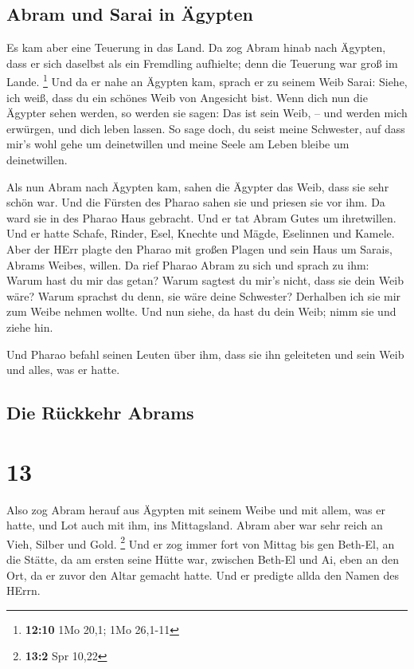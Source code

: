 \hypertarget{abram-und-sarai-in-uxe4gypten}{%
\subsection{Abram und Sarai in
Ägypten}\label{abram-und-sarai-in-uxe4gypten}}

 Es kam aber eine Teuerung in das Land. Da zog Abram
hinab nach Ägypten, dass er sich daselbst als ein Fremdling aufhielte;
denn die Teuerung war groß im Lande. \footnote{\textbf{12:10} 1Mo 20,1;
  1Mo 26,1-11}  Und da er nahe an Ägypten kam, sprach er
zu seinem Weib Sarai: Siehe, ich weiß, dass du ein schönes Weib von
Angesicht bist.  Wenn dich nun die Ägypter sehen werden,
so werden sie sagen: Das ist sein Weib, -- und werden mich erwürgen, und
dich leben lassen.  So sage doch, du seist meine
Schwester, auf dass mir's wohl gehe um deinetwillen und meine Seele am
Leben bleibe um deinetwillen.

 Als nun Abram nach Ägypten kam, sahen die Ägypter das
Weib, dass sie sehr schön war.  Und die Fürsten des
Pharao sahen sie und priesen sie vor ihm. Da ward sie in des Pharao Haus
gebracht.  Und er tat Abram Gutes um ihretwillen. Und er
hatte Schafe, Rinder, Esel, Knechte und Mägde, Eselinnen und Kamele.
 Aber der HErr plagte den Pharao mit großen Plagen und
sein Haus um Sarais, Abrams Weibes, willen.  Da rief
Pharao Abram zu sich und sprach zu ihm: Warum hast du mir das getan?
Warum sagtest du mir's nicht, dass sie dein Weib wäre? 
Warum sprachst du denn, sie wäre deine Schwester? Derhalben ich sie mir
zum Weibe nehmen wollte. Und nun siehe, da hast du dein Weib; nimm sie
und ziehe hin.

 Und Pharao befahl seinen Leuten über ihm, dass sie ihn
geleiteten und sein Weib und alles, was er hatte.

\hypertarget{die-ruxfcckkehr-abrams}{%
\subsection{Die Rückkehr Abrams}\label{die-ruxfcckkehr-abrams}}

\hypertarget{section-12}{%
\section{13}\label{section-12}}

 Also zog Abram herauf aus Ägypten mit seinem Weibe und
mit allem, was er hatte, und Lot auch mit ihm, ins Mittagsland.
 Abram aber war sehr reich an Vieh, Silber und Gold.
\footnote{\textbf{13:2} Spr 10,22}  Und er zog immer fort
von Mittag bis gen Beth-El, an die Stätte, da am ersten seine Hütte war,
zwischen Beth-El und Ai,  eben an den Ort, da er zuvor den
Altar gemacht hatte. Und er predigte allda den Namen des HErrn.

